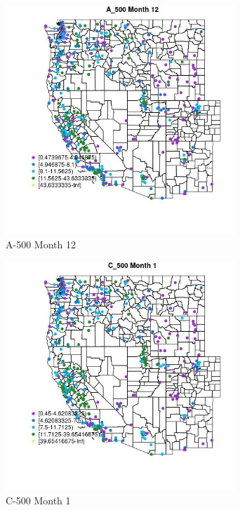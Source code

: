 \begin{figure} 
\centering  
\includegraphics[width=0.77\textwidth]{Code_Outputs/ML_input_report_ML_input_PM25_Step5_part_d_de_duplicated_aves_ML_input_MapObsMo12A_500.jpg} 
\caption{\label{fig:ML_input_report_ML_input_PM25_Step5_part_d_de_duplicated_aves_ML_inputMapObsMo12A_500}A-500 Month 12} 
\end{figure} 
 

\begin{figure} 
\centering  
\includegraphics[width=0.77\textwidth]{Code_Outputs/ML_input_report_ML_input_PM25_Step5_part_d_de_duplicated_aves_ML_input_MapObsMo1C_500.jpg} 
\caption{\label{fig:ML_input_report_ML_input_PM25_Step5_part_d_de_duplicated_aves_ML_inputMapObsMo1C_500}C-500 Month 1} 
\end{figure} 
 

